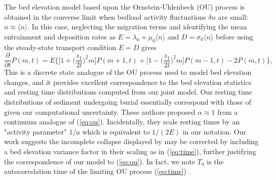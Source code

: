 \documentclass[draft]{agujournal2018}
\begin{document}
The \citet{Martin2014} bed elevation model based upon the Ornstein-Uhlenbeck (OU) process is obtained in the converse limit when bedload activity fluctuations $\delta n$ are small: $n \approx \langle n \rangle$.
In this case, neglecting the migration terms and identifying the mean entrainment and deposition rates as $E =\lambda_0 + \mu_0 \langle n \rangle$ and $D = \sigma_0 \langle n \rangle$ before using the steady-state transport condition $E=D$ \citep[e.g.,][]{Einstein1950} gives
\begin{equation} \frac{\partial}{\partial t}P(m,t) =  E \Big\{ \Big[1 +\Big(\frac{z_1}{2 l}\Big)^2m\Big]P(m+1,t) +  \Big[1 -\Big(\frac{z_1}{2 l}\Big)^2m\Big]P(m-1,t) - 2P(m,t)\Big\}, \label{eq:ou}\end{equation}
This is a discrete state analogue of the OU process \citet{Martin2014} used to model bed elevation changes, and it provides excellent correspondence to the bed elevation statistics and resting time distributions computed from our joint model.
Our resting time distributions of sediment undergoing burial essentially correspond with those of \citet{Martin2014} given our computational uncertainty.
These authors proposed $\alpha \approx 1 $ from a continuum analogue of (\ref{eq:ou}).
Incidentally, they scale resting times by an "activity parameter" $1/a$ which is equivalent to $1/(2E)$ in our notation.
Our work suggests the incomplete collapse displayed by \citet{Martin2014} may be corrected by including a bed elevation variance factor in their scaling as in (\ref{eq:time}), further justifying the correspondence of our model to (\ref{eq:ou}).
In fact, we note $T_0$ is the autocorrelation time of the limiting OU process (\ref{eq:time}) \citep[e.g.,][]{Gardiner1983}.
\end{document}
